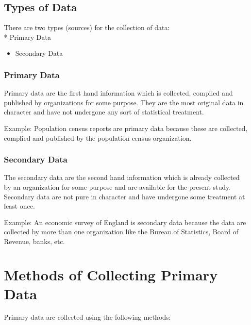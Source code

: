 \documentclass[
]{book}
\providecommand{\tightlist}{%
  \setlength{\itemsep}{0pt}\setlength{\parskip}{0pt}}
\begin{document}
\hypertarget{types-of-data}{%
\subsection{Types of Data}\label{types-of-data}}

There are two types (sources) for the collection of data:\\
* Primary Data

\begin{itemize}
\tightlist
\item
  Secondary Data
\end{itemize}

\hypertarget{primary-data}{%
\subsubsection{Primary Data}\label{primary-data}}

Primary data are the first hand information which is collected, compiled
and published by organizations for some purpose. They are the most
original data in character and have not undergone any sort of
statistical treatment.

Example: Population census reports are primary data because these are
collected, complied and published by the population census organization.

\hypertarget{secondary-data}{%
\subsubsection{Secondary Data}\label{secondary-data}}

The secondary data are the second hand information which is already
collected by an organization for some purpose and are available for the
present study. Secondary data are not pure in character and have
undergone some treatment at least once.

Example: An economic survey of England is secondary data because the
data are collected by more than one organization like the Bureau of
Statistics, Board of Revenue, banks, etc.

\hypertarget{methods-of-collecting-primary-data}{%
\section{Methods of Collecting Primary Data}\label{methods-of-collecting-primary-data}}

Primary data are collected using the following methods:
\end{document}

